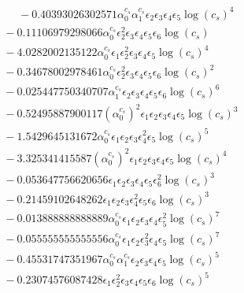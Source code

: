 \documentclass[10pt]{article}
\begin{document}
\begin{align*}
\phantom{F_{s,7}} &\phantom{={}}{}  - 0.40393026302571 \alpha_{0}^{c_s} \alpha_{1}^{c_s} \epsilon_{2} \epsilon_{3} \epsilon_{4} \epsilon_{5} \log{\left(c_{s} \right)}^{4} \\
&{}  - 0.11106979298066 \alpha_{0}^{c_s} \epsilon_{2}^{2} \epsilon_{3} \epsilon_{4} \epsilon_{5} \epsilon_{6} \log{\left(c_{s} \right)} \\
&{}  - 4.0282002135122 \alpha_{0}^{c_s} \epsilon_{1} \epsilon_{2}^{2} \epsilon_{3} \epsilon_{4} \epsilon_{5} \log{\left(c_{s} \right)}^{4} \\
&{}  - 0.34678002978461 \alpha_{0}^{c_s} \epsilon_{2}^{2} \epsilon_{3} \epsilon_{4} \epsilon_{5} \epsilon_{6} \log{\left(c_{s} \right)}^{2} \\
&{}  - 0.025447750340707 \alpha_{1}^{c_s} \epsilon_{2} \epsilon_{3} \epsilon_{4} \epsilon_{5} \epsilon_{6} \log{\left(c_{s} \right)}^{6} \\
&{}  - 0.52495887900117 \left(\alpha_{0}^{c_s}\right)^{2} \epsilon_{1} \epsilon_{2} \epsilon_{3} \epsilon_{4} \epsilon_{5} \log{\left(c_{s} \right)}^{3} \\
&{}  - 1.5429645131672 \alpha_{0}^{c_s} \epsilon_{1} \epsilon_{2} \epsilon_{3} \epsilon_{4}^{2} \epsilon_{5} \log{\left(c_{s} \right)}^{5} \\
&{}  - 3.325341415587 \left(\alpha_{0}^{c_s}\right)^{2} \epsilon_{1} \epsilon_{2} \epsilon_{3} \epsilon_{4} \epsilon_{5} \log{\left(c_{s} \right)}^{4} \\
&{}  - 0.053647756620656 \epsilon_{1} \epsilon_{2} \epsilon_{3} \epsilon_{4} \epsilon_{5} \epsilon_{6}^{2} \log{\left(c_{s} \right)}^{3} \\
&{}  - 0.21459102648262 \epsilon_{1} \epsilon_{2} \epsilon_{3} \epsilon_{4}^{2} \epsilon_{5} \epsilon_{6} \log{\left(c_{s} \right)}^{3} \\
&{}  - 0.013888888888889 \alpha_{0}^{c_s} \epsilon_{1} \epsilon_{2} \epsilon_{3} \epsilon_{4} \epsilon_{5}^{2} \log{\left(c_{s} \right)}^{7} \\
&{}  - 0.055555555555556 \alpha_{0}^{c_s} \epsilon_{1} \epsilon_{2} \epsilon_{3}^{2} \epsilon_{4} \epsilon_{5} \log{\left(c_{s} \right)}^{7} \\
&{}  - 0.45531747351967 \alpha_{0}^{c_s} \alpha_{1}^{c_s} \epsilon_{2} \epsilon_{3} \epsilon_{4} \epsilon_{5} \log{\left(c_{s} \right)}^{5} \\
&{}  - 0.23074576087428 \epsilon_{1} \epsilon_{2}^{2} \epsilon_{3} \epsilon_{4} \epsilon_{5} \epsilon_{6} \log{\left(c_{s} \right)}^{5} \\

\end{align*}
\end{document}
